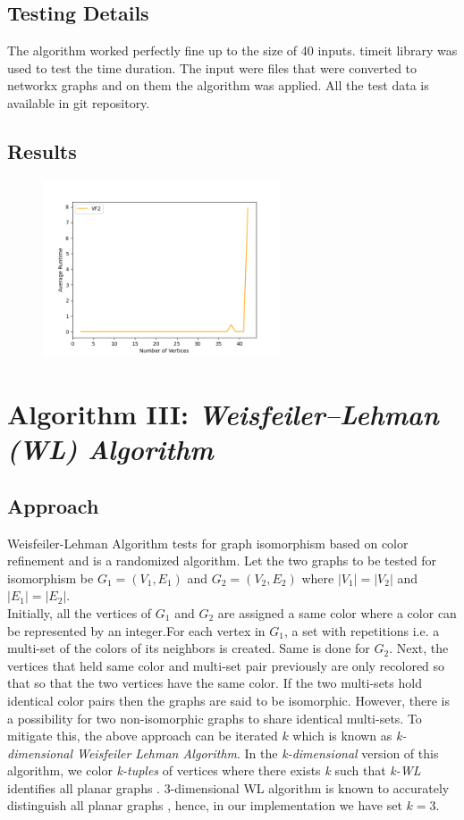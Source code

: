 \documentclass[11pt]{article}
\begin{document}
\subsection{Testing Details}
\label{ssec:fonts}
The algorithm worked perfectly fine up to the size of 40 inputs. timeit library was used to test the time duration. The input were files that were converted to networkx graphs and on them the algorithm was applied. All the test data is available in git repository. 

\subsection{Results}
\begin{figure}[H]
    \centering
    \includegraphics[width=7cm]{vf2.png}
\end{figure}
\label{ssec:first}


\section{Algorithm III: \textit{Weisfeiler–Lehman (WL) Algorithm}}

\subsection{Approach}
Weisfeiler-Lehman Algorithm \cite{shervashidze2011weisfeiler} tests for graph isomorphism based on color refinement and is a randomized algorithm. Let the two graphs to be tested for isomorphism be $G_1 = (V_1, E_1)$ and $G_2 = (V_2 , E_2)$ where $|V_1| = |V_2|$ and $|E_1| = |E_2|$.\\
Initially, all the vertices of $G_1$ and $G_2$ are assigned a same color where a color can be represented by an integer.For each vertex in $G_1$, a set with repetitions i.e. a multi-set of the colors of its neighbors is created. Same is done for $G_2$. Next, the vertices that held same color and multi-set pair previously are only recolored so that so that the two vertices have the same color. If the two multi-sets hold identical color pairs then the graphs are said to be isomorphic. However, there is a possibility for two non-isomorphic graphs to share identical multi-sets. To mitigate this, the above approach can be iterated $k$ which is known as \textit{k-dimensional Weisfeiler Lehman Algorithm}. In the \textit{k-dimensional} version of this algorithm, we color \textit{k-tuples} of vertices where there exists \textit{k} such that \textit{k-WL} identifies all planar graphs \cite{grohe2017color}. 3-dimensional WL algorithm is known to accurately distinguish  all planar graphs \cite{wlTest}, hence, in our implementation we have set $k = 3$.
\end{document}
